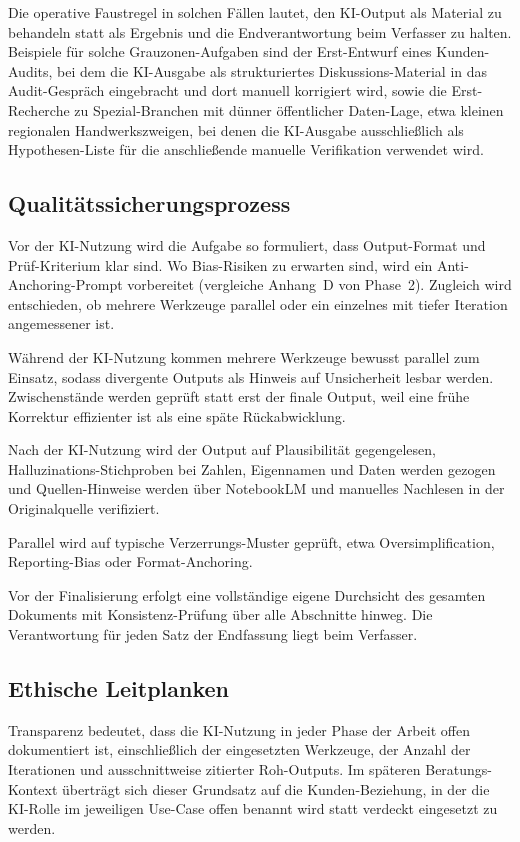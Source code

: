 \documentclass[a4paper,11pt]{article}
\begin{document}
Die operative Faustregel in solchen Fällen lautet, den KI-Output als
Material zu behandeln statt als Ergebnis und die Endverantwortung beim
Verfasser zu halten. Beispiele für solche Grauzonen-Aufgaben sind der
Erst-Entwurf eines Kunden-Audits, bei dem die KI-Ausgabe als
strukturiertes Diskussions-Material in das Audit-Gespräch eingebracht
und dort manuell korrigiert wird, sowie die Erst-Recherche zu
Spezial-Branchen mit dünner öffentlicher Daten-Lage, etwa kleinen
regionalen Handwerkszweigen, bei denen die KI-Ausgabe ausschließlich
als Hypothesen-Liste für die anschließende manuelle Verifikation
verwendet wird.

\subsection{Qualitätssicherungsprozess}

Vor der KI-Nutzung wird die Aufgabe so formuliert, dass Output-Format
und Prüf-Kriterium klar sind. Wo Bias-Risiken zu erwarten sind, wird
ein Anti-Anchoring-Prompt vorbereitet (vergleiche Anhang~D von
Phase~2). Zugleich wird entschieden, ob mehrere Werkzeuge parallel oder
ein einzelnes mit tiefer Iteration angemessener ist.

Während der KI-Nutzung kommen mehrere Werkzeuge bewusst parallel zum
Einsatz, sodass divergente Outputs als Hinweis auf Unsicherheit lesbar
werden. Zwischenstände werden geprüft statt erst der finale Output,
weil eine frühe Korrektur effizienter ist als eine späte Rückabwicklung.

Nach der KI-Nutzung wird der Output auf Plausibilität gegengelesen,
Halluzinations-Stichproben bei Zahlen, Eigennamen und Daten werden
gezogen und Quellen-Hinweise werden über NotebookLM und manuelles
Nachlesen in der Originalquelle verifiziert.

Parallel wird auf typische Verzerrungs-Muster geprüft, etwa
Oversimplification, Reporting-Bias oder Format-Anchoring.

Vor der Finalisierung erfolgt eine vollständige eigene Durchsicht des
gesamten Dokuments mit Konsistenz-Prüfung über alle Abschnitte hinweg.
Die Verantwortung für jeden Satz der Endfassung liegt beim Verfasser.

\subsection{Ethische Leitplanken}

Transparenz bedeutet, dass die KI-Nutzung in jeder Phase der Arbeit
offen dokumentiert ist, einschließlich der eingesetzten Werkzeuge, der
Anzahl der Iterationen und ausschnittweise zitierter Roh-Outputs. Im
späteren Beratungs-Kontext überträgt sich dieser Grundsatz auf die
Kunden-Beziehung, in der die KI-Rolle im jeweiligen Use-Case offen
benannt wird statt verdeckt eingesetzt zu werden.
\end{document}
